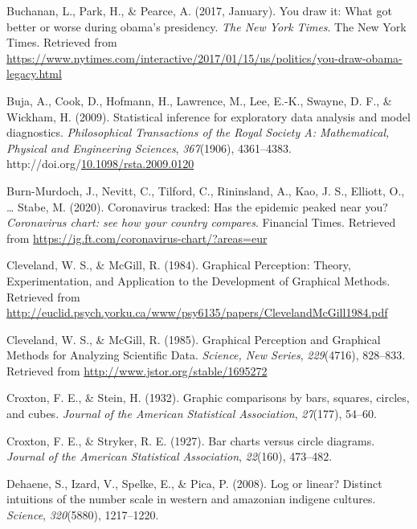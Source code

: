 \documentclass[print]{nuthesis}
\newlength{\cslhangindent}
\newenvironment{CSLReferences}%
{\setlength{\parindent}{0pt}%
\everypar{\setlength{\hangindent}{\cslhangindent}}\ignorespaces}%
{\par}
\begin{document}
\begin{CSLReferences}{1}{0}
\leavevmode\hypertarget{ref-buchanan_park_pearce_2017}{}%
Buchanan, L., Park, H., \& Pearce, A. (2017, January). You draw it: What got better or worse during obama's presidency. \emph{The New York Times}. The New York Times. Retrieved from \url{https://www.nytimes.com/interactive/2017/01/15/us/politics/you-draw-obama-legacy.html}

\leavevmode\hypertarget{ref-buja_statistical_2009}{}%
Buja, A., Cook, D., Hofmann, H., Lawrence, M., Lee, E.-K., Swayne, D. F., \& Wickham, H. (2009). Statistical inference for exploratory data analysis and model diagnostics. \emph{Philosophical Transactions of the Royal Society A: Mathematical, Physical and Engineering Sciences}, \emph{367}(1906), 4361--4383. http://doi.org/\href{https://doi.org/10.1098/rsta.2009.0120}{10.1098/rsta.2009.0120}

\leavevmode\hypertarget{ref-burnmurdoch_2020}{}%
Burn-Murdoch, J., Nevitt, C., Tilford, C., Rininsland, A., Kao, J. S., Elliott, O., \ldots{} Stabe, M. (2020). Coronavirus tracked: Has the epidemic peaked near you? \emph{Coronavirus chart: see how your country compares}. Financial Times. Retrieved from \url{https://ig.ft.com/coronavirus-chart/?areas=eur}

\leavevmode\hypertarget{ref-cleveland_graphical_1984}{}%
Cleveland, W. S., \& McGill, R. (1984). Graphical {Perception}: {Theory}, {Experimentation}, and {Application} to the {Development} of {Graphical} {Methods}. Retrieved from \url{http://euclid.psych.yorku.ca/www/psy6135/papers/ClevelandMcGill1984.pdf}

\leavevmode\hypertarget{ref-cleveland_graphical_1985}{}%
Cleveland, W. S., \& McGill, R. (1985). Graphical {Perception} and {Graphical} {Methods} for {Analyzing} {Scientific} {Data}. \emph{Science, New Series}, \emph{229}(4716), 828--833. Retrieved from \url{http://www.jstor.org/stable/1695272}

\leavevmode\hypertarget{ref-croxton1932graphic}{}%
Croxton, F. E., \& Stein, H. (1932). Graphic comparisons by bars, squares, circles, and cubes. \emph{Journal of the American Statistical Association}, \emph{27}(177), 54--60.

\leavevmode\hypertarget{ref-croxton1927bar}{}%
Croxton, F. E., \& Stryker, R. E. (1927). Bar charts versus circle diagrams. \emph{Journal of the American Statistical Association}, \emph{22}(160), 473--482.

\leavevmode\hypertarget{ref-dehaene2008log}{}%
Dehaene, S., Izard, V., Spelke, E., \& Pica, P. (2008). Log or linear? Distinct intuitions of the number scale in western and amazonian indigene cultures. \emph{Science}, \emph{320}(5880), 1217--1220.


\end{CSLReferences}
\end{document}
